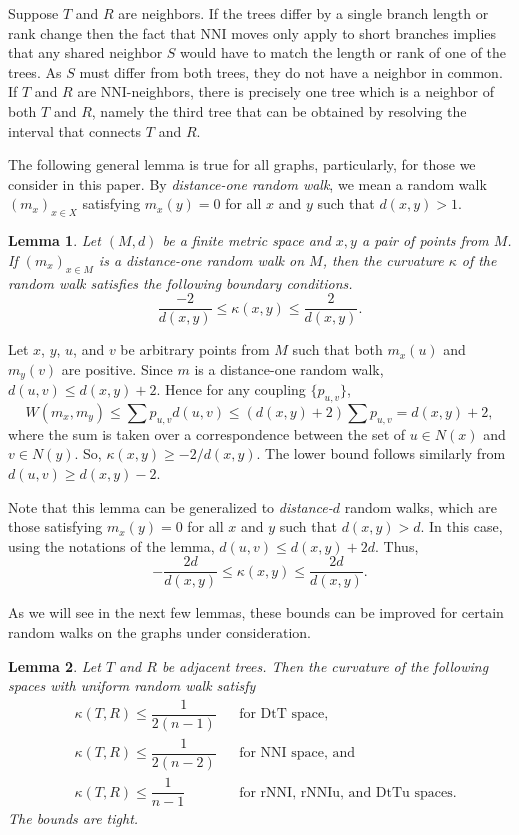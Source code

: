 \documentclass{amsart}
\newtheorem{lemma}{Lemma}
\theoremstyle{definition}
\newcommand{\nni}{\mathrm{NNI}}
\newcommand{\rnni}{\mathrm{rNNI}}
\newcommand{\rnniu}{\mathrm{rNNIu}}
\newcommand{\mdts}{\mathrm{DtT}}
\newcommand{\mdtsu}{\mathrm{DtTu}}
\begin{document}
\proof
Suppose $T$ and $R$ are neighbors.
If the trees differ by a single branch length or rank change then the fact that NNI moves only apply to short branches implies that any shared neighbor $S$ would have to match the length or rank of one of the trees.
As $S$ must differ from both trees, they do not have a neighbor in common.
If $T$ and $R$ are NNI-neighbors, there is precisely one tree which is a neighbor of both $T$ and $R$, namely the third tree that can be obtained by resolving the interval that connects $T$ and $R$.
\endproof

The following general lemma is true for all graphs, particularly, for those we consider in this paper.
By {\em distance-one random walk}, we mean a random walk $(m_x)_{x \in X}$ satisfying $m_x(y) = 0$ for all $x$ and $y$ such that $d(x,y) > 1$.

\begin{lemma}\label{curvBoundGeneral}
Let $(M,d)$ be a finite metric space and $x,y$ a pair of points from $M$.
If $(m_x)_{x \in M}$ is a distance-one random walk on $M$, then the curvature $\kappa$ of the random walk satisfies the following boundary conditions.
\[
\dfrac{-2}{d(x,y)} \leq \kappa(x,y) \leq \dfrac{2}{d(x,y)}.
\]
\end{lemma}

\proof
Let $x$, $y$, $u$, and $v$ be arbitrary points from $M$ such that both $m_x(u)$ and $m_y(v)$ are positive.
Since $m$ is a distance-one random walk, $d(u,v) \leq d(x,y) + 2$.
Hence for any coupling $\{p_{u,v}\}$,
\[
W(m_x,m_y) \leq \sum p_{u,v} d(u,v) \leq (d(x,y)+2)\sum p_{u,v} = d(x,y) + 2,
\]
where the sum is taken over a correspondence between the set of $u \in N(x)$ and $v \in N(y)$.
So, $\kappa(x,y) \geq - 2/d(x,y)$.
The lower bound follows similarly from $d(u,v) \geq d(x,y) - 2$.
\endproof

Note that this lemma can be generalized to {\em distance-$d$} random walks, which are those satisfying $m_x(y) = 0$ for all $x$ and $y$ such that $d(x,y) > d$.
In this case, using the notations of the lemma, $d(u,v) \leq d(x,y) + 2d$.
Thus,
\[
-\dfrac{2d}{d(x,y)} \leq \kappa(x,y) \leq \dfrac{2d}{d(x,y)}.
\]

As we will see in the next few lemmas, these bounds can be improved for certain random walks on the graphs under consideration.

\begin{lemma}\label{uniformUpper}
Let $T$ and $R$ be adjacent trees.
Then the curvature of the following spaces with uniform random walk satisfy
\begin{align*}
& \kappa(T,R) \leq \dfrac{1}{2(n-1)}	&& \mbox{for $\mdts$ space,}\\
& \kappa(T,R) \leq \dfrac{1}{2(n-2)}	&& \mbox{for $\nni$ space, and}\\
& \kappa(T,R) \leq \dfrac{1}{n-1}	&& \mbox{for $\rnni$, $\rnniu$, and $\mdtsu$ spaces.}
\end{align*}
The bounds are tight.
\end{lemma}
\end{document}
